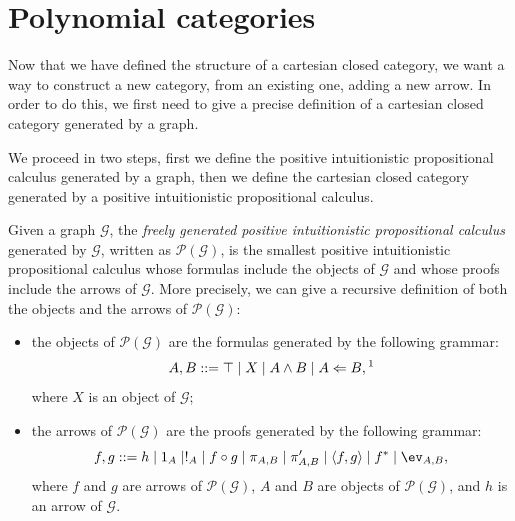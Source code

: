  
\section{Polynomial categories}
Now that we have defined the structure of a cartesian closed category, we want a way to construct a new category, from an existing one, adding a new arrow.
In order to do this, we first need to give a precise definition of a cartesian closed category generated by a graph.

We proceed in two steps, first we define the positive intuitionistic propositional calculus generated by a graph, then we define the cartesian closed category generated by a positive intuitionistic propositional calculus.

\begin{definition}
    Given a graph $\mathcal G$, the \textit{freely generated positive intuitionistic propositional calculus} generated by $\mathcal G$, written as $\mathcal P(\mathcal G)$,
    is the smallest positive intuitionistic propositional calculus whose formulas include the objects of $\mathcal G$ and whose proofs include the arrows of $\mathcal G$.
    More precisely, we can give a recursive definition of both the objects and the arrows of $\mathcal P(\mathcal G)$:
    \begin{itemize}
        \item the objects of $\mathcal P(\mathcal G)$ are the formulas generated by the following grammar:
        \[ A,B ::= \top \mid X \mid A \land B \mid A \Leftarrow B,\text{\footnotemark} \]
        where $X$ is an object of $\mathcal G$;
        \item the arrows of $\mathcal P(\mathcal G)$ are the proofs generated by the following grammar:
        \[ f,g ::= h \mid 1_A \mid !_A \mid f \circ g \mid \pi_{A,B} \mid \pi_{A,B}' \mid \langle f,g\rangle \mid f^* \mid \ev_{A,B},\]
        where $f$ and $g$ are arrows of $\mathcal P(\mathcal G)$, $A$ and $B$ are objects of $\mathcal P(\mathcal G)$, and $h$ is an arrow of $\mathcal G$.
    \end{itemize} 
\end{definition}

